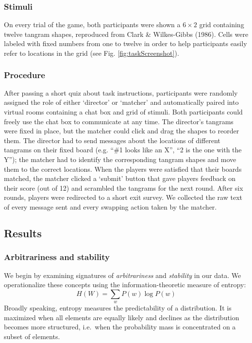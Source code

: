 \documentclass[10pt, letterpaper]{article}
\begin{document}
\subsubsection{Stimuli}\label{stimuli}

On every trial of the game, both participants were shown a
\(6 \times 2\) grid containing twelve tangram shapes, reproduced from
Clark \& Wilkes-Gibbs (1986). Cells were labeled with fixed numbers from
one to twelve in order to help participants easily refer to locations in
the grid (see Fig. \ref{fig:taskScreenshot}).

\subsubsection{Procedure}\label{procedure}

After passing a short quiz about task instructions, participants were
randomly assigned the role of either `director' or `matcher' and
automatically paired into virtual rooms containing a chat box and grid
of stimuli. Both participants could freely use the chat box to
communicate at any time. The director's tangrams were fixed in place,
but the matcher could click and drag the shapes to reorder them. The
director had to send messages about the locations of different tangrams
on their fixed board (e.g. ``\#1 looks like an X'', ``2 is the one with
the Y''); the matcher had to identify the corresponding tangram shapes
and move them to the correct locations. When the players were satisfied
that their boards matched, the matcher clicked a `submit' button that
gave players feedback on their score (out of 12) and scrambled the
tangrams for the next round. After six rounds, players were redirected
to a short exit survey. We collected the raw text of every message sent
and every swapping action taken by the matcher.

\subsection{Results}\label{results}

\subsubsection{Arbitrariness and
stability}\label{arbitrariness-and-stability}

We begin by examining signatures of \emph{arbitrariness} and
\emph{stability} in our data. We operationalize these concepts using the
information-theoretic measure of entropy:
\[H(W) = \sum_w P(w) \log P(w)\] Broadly speaking, entropy measures the
predictability of a distribution. It is maximized when all elements are
equally likely and declines as the distribution becomes more structured,
i.e.~when the probability mass is concentrated on a subset of elements.
\end{document}
